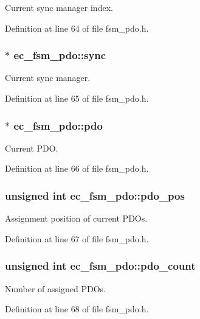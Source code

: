 Current sync manager index. 



Definition at line 64 of file fsm\-\_\-pdo.\-h.

\subsubsection[{sync}]{$\ast$ ec\-\_\-fsm\-\_\-pdo\-::sync}\label{structec__fsm__pdo_a38e76d6856ae5035b91bf5b0850218ad}


Current sync manager. 



Definition at line 65 of file fsm\-\_\-pdo.\-h.

\subsubsection[{pdo}]{$\ast$ ec\-\_\-fsm\-\_\-pdo\-::pdo}\label{structec__fsm__pdo_a437d446a8f8d784d8622ed302b3d51a1}


Current P\-D\-O. 



Definition at line 66 of file fsm\-\_\-pdo.\-h.

\subsubsection[{pdo\-\_\-pos}]{\setlength{\rightskip}{0pt plus 5cm}unsigned int ec\-\_\-fsm\-\_\-pdo\-::pdo\-\_\-pos}\label{structec__fsm__pdo_aec477e3e790d99da798a44e7523c0508}


Assignment position of current P\-D\-Os. 



Definition at line 67 of file fsm\-\_\-pdo.\-h.

\subsubsection[{pdo\-\_\-count}]{\setlength{\rightskip}{0pt plus 5cm}unsigned int ec\-\_\-fsm\-\_\-pdo\-::pdo\-\_\-count}\label{structec__fsm__pdo_a60d790b9858292f2229115dabc994c08}


Number of assigned P\-D\-Os. 



Definition at line 68 of file fsm\-\_\-pdo.\-h.

